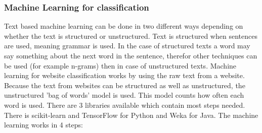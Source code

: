 \subsubsection{Machine Learning for classification}
Text based machine learning can be done in two different ways depending on whether the text is structured or unstructured. Text is structured when sentences are used, meaning grammar is used. In the case of structured texts a word may say something about the next word in the sentence, therefor other techniques can be used (for example n-grams) then in case of unstructured texts.
Machine learning for website classification works by using the raw text from a website. Because the text from websites can be structured as well as unstructured, the unstructured 'bag of words' model is used. This model counts how often each word is used. There are 3 libraries available which contain most steps needed. There is scikit-learn \cite{scikit-learn} and TensorFlow \cite{tensorFlow} for Python and Weka \cite{weka} for Java.
The machine learning works in 4 steps:
